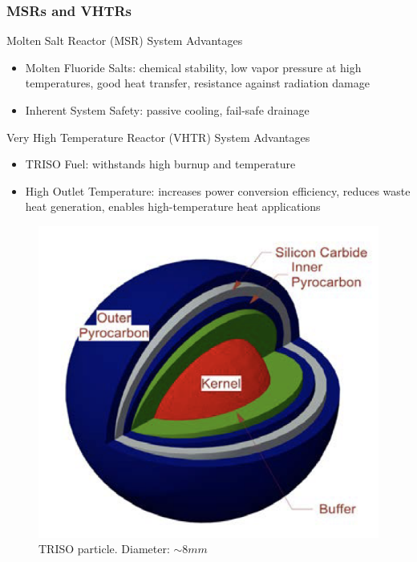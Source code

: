     \begin{frame}
    \frametitle{MSRs and VHTRs}
    \begin{block}{Molten Salt Reactor (MSR) System Advantages}
        \begin{itemize}
        \item Molten Fluoride Salts: chemical stability, low vapor pressure at 
        high temperatures, good heat transfer, resistance against radiation damage
        \item Inherent System Safety: passive cooling, fail-safe drainage
        \end{itemize}
    \end{block}
    \vspace{-0.25cm}
    \begin{block}{Very High Temperature Reactor (VHTR) System Advantages}
        \begin{itemize}
        \item TRISO Fuel: withstands high burnup and temperature
        \item High Outlet Temperature: increases power conversion efficiency, reduces 
        waste heat generation, enables high-temperature heat applications 
        \end{itemize}
    \end{block}
    \begin{figure}[htbp!]
        \includegraphics[width=0.2\linewidth]{../docs/figures/ahtr-triso.png}
        \caption{TRISO particle. Diameter: $\sim 8mm$}
    \end{figure}
    \end{frame}
